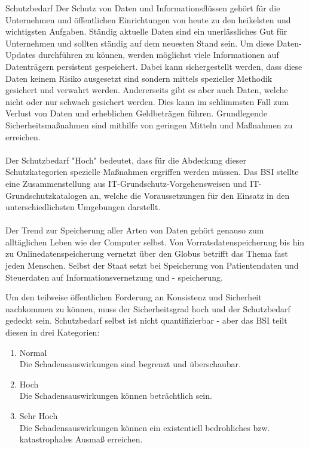  \label{Schutzbedarf}
 \begin{section}{Schutzbedarf}
  Der Schutz von Daten und Informationsflüssen gehört für die Unternehmen und öffentlichen
  Einrichtungen von heute zu den heikelsten und wichtigsten Aufgaben. Ständig aktuelle 
  Daten sind ein unerlässliches Gut für Unternehmen und sollten ständig auf dem neuesten 
  Stand sein. Um diese Daten-Updates durchführen zu können, werden möglichst viele 
  Informationen auf Datenträgern persistent gespeichert. Dabei kann sichergestellt werden, 
  dass diese Daten keinem Risiko ausgesetzt sind sondern mittels spezieller Methodik 
  gesichert und verwahrt werden. Andererseits gibt es aber auch Daten, welche nicht oder 
  nur schwach gesichert werden. Dies kann im schlimmsten Fall zum Verlust von Daten und 
  erheblichen Geldbeträgen führen. Grundlegende Sicherheitsmaßnahmen sind mithilfe von 
  geringen Mitteln und Maßnahmen zu erreichen. \\
  \\
  Der Schutzbedarf "Hoch" bedeutet, dass für die Abdeckung dieser Schutzkategorien 
  spezielle Maßnahmen ergriffen werden müssen. 
  Das \ac{BSI} stellte eine Zusammenstellung aus IT-Grundschutz-Vorgehensweisen und IT-Grundschutzkatalogen
  an, welche die Voraussetzungen für den Einsatz in den unterschiedlichsten Umgebungen 
  darstellt. \\
  \\
  Der Trend zur Speicherung aller Arten von Daten gehört genauso zum alltäglichen Leben 
  wie der Computer selbst. Von Vorratsdatenspeicherung bis hin zu Onlinedatenspeicherung 
  vernetzt über den Globus betrifft das Thema fast jeden Menschen. Selbst der Staat setzt 
  bei Speicherung von Patientendaten und Steuerdaten auf Informationsvernetzung und - speicherung.   
  \pagebreak
  
  Um den teilweise öffentlichen Forderung an Konsistenz und Sicherheit nachkommen zu 
  können, muss der Sicherheitsgrad hoch und der Schutzbedarf gedeckt sein. 
  Schutzbedarf selbst ist nicht quantifizierbar - aber das \ac{BSI} teilt diesen in drei 
  Kategorien: \cite{BSIBedarf} \\
  \begin{enumerate} 
   \item Normal \\
    Die Schadensauswirkungen sind begrenzt und überschaubar.
   \item Hoch \\
    Die Schadensauswirkungen können beträchtlich sein.
   \item Sehr Hoch \\
    Die Schadensauswirkungen können ein existentiell bedrohliches bzw. katastrophales 
    Ausmaß erreichen. 
  \end{enumerate}
  

\end{section}
